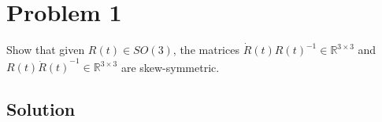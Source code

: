 \section*{Problem 1}

Show that given \( R(t) \in SO(3) \), the matrices \( \dot{R}(t) {R(t)}^{-1} \in \mathbb{R}^{3 \times 3} \) and \( R(t) {\dot{R}(t)}^{-1} \in \mathbb{R}^{3 \times 3} \) are skew-symmetric.

\subsection*{Solution}

